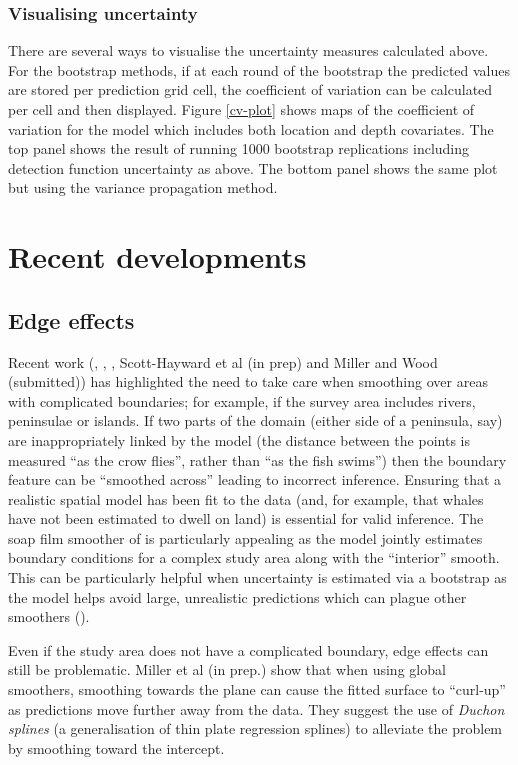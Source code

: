 \documentclass[a4paper,12pt]{article}
\begin{document}
\subsubsection*{Visualising uncertainty}

There are several ways to visualise the uncertainty measures calculated above. For the bootstrap methods, if at each round of the bootstrap the predicted values are stored per prediction grid cell, the coefficient of variation can be calculated per cell and then displayed. Figure \ref{cv-plot} shows maps of the coefficient of variation for the model which includes both location and depth covariates. The top panel shows the result of running 1000 bootstrap replications including detection function uncertainty as above. The bottom panel shows the same plot but using the variance propagation method.


\section*{Recent developments}
\label{s:recentadvances}

\subsection*{Edge effects}
\label{s:leakage}

Recent work (\cite{Ramsay:2002uo}, \cite{Wang:2007tf}, \cite{Wood:2008vo}, Scott-Hayward et al (in prep) and Miller and Wood (submitted)) has highlighted the need to take care when smoothing over areas with complicated boundaries; for example, if the survey area includes rivers, peninsulae or islands. If two parts of the domain (either side of a peninsula, say) are inappropriately linked by the model (the distance between the points is measured ``as the crow flies'', rather than ``as the fish swims'') then the boundary feature can be ``smoothed across'' leading to incorrect inference. Ensuring that a realistic spatial model has been fit to the data (and, for example, that whales have not been estimated to dwell on land) is essential for valid inference. The soap film smoother of \cite{Wood:2008vo} is particularly appealing as the model jointly estimates boundary conditions for a complex study area along with the ``interior'' smooth. This can be particularly helpful when uncertainty is estimated via a bootstrap as the model helps avoid large, unrealistic predictions which can plague other smoothers (\cite{Bravington:2009vo}).

Even if the study area does not have a complicated boundary, edge effects can still be problematic. Miller et al (in prep.) show that when using global smoothers, smoothing towards the plane can cause the fitted surface to ``curl-up'' as predictions move further away from the data. They suggest the use of \textit{Duchon splines} (a generalisation of thin plate regression splines) to alleviate the problem by smoothing toward the intercept.
\end{document}
